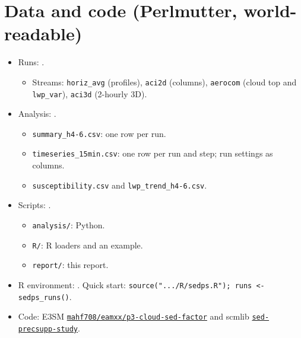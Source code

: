 \section{Data and code (Perlmutter, world-readable)}
\begin{itemize}\small
\item Runs: .
\begin{itemize}
\item Streams: \texttt{horiz\_avg} (profiles), \texttt{aci2d} (columns), \texttt{aerocom} (cloud top and \texttt{lwp\_var}), \texttt{aci3d} (2-hourly 3D).
\end{itemize}
\item Analysis: .
\begin{itemize}
\item \texttt{summary\_h4-6.csv}: one row per run.
\item \texttt{timeseries\_15min.csv}: one row per run and step; run settings as columns.
\item \texttt{susceptibility.csv} and \texttt{lwp\_trend\_h4-6.csv}.
\end{itemize}
\item Scripts: .
\begin{itemize}
\item \texttt{analysis/}: Python.
\item \texttt{R/}: R loaders and an example.
\item \texttt{report/}: this report.
\end{itemize}
\item R environment: . Quick start: \texttt{source(".../R/sedps.R"); runs <- sedps\_runs()}.
\item Code: E3SM \href{https://github.com/mahf708/E3SM/tree/mahf708/eamxx/p3-cloud-sed-factor}{\texttt{mahf708/eamxx/p3-cloud-sed-factor}}
and scmlib \href{https://github.com/mahf708/scmlib/tree/sed-precsupp-study}{\texttt{sed-precsupp-study}}.
\end{itemize}
